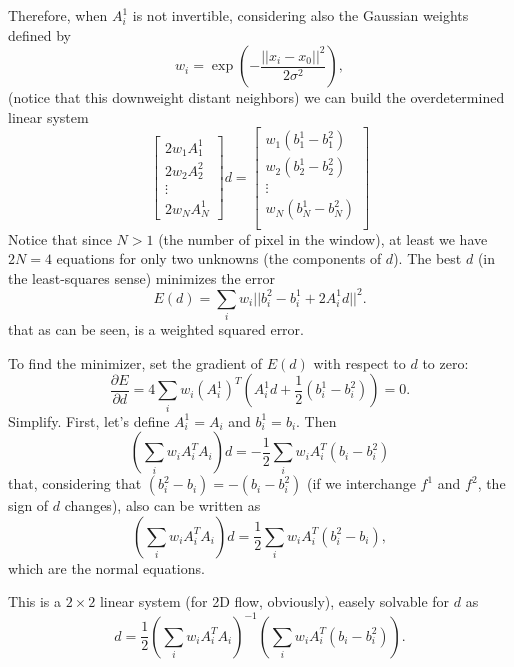 Therefore, when $A^1_i$ is not invertible, considering also the Gaussian weights defined by
\begin{equation}
  w_i = \exp\left( -\frac{||x_i-x_0||^2}{2\sigma^2} \right),
\end{equation}
(notice that this downweight distant neighbors) we can build the overdetermined linear system
\begin{equation}
  \begin{bmatrix}
2w_1A^1_1 \\
2w_2A^2_2 \\
\vdots \\
2w_NA^1_N
\end{bmatrix}
d =
\begin{bmatrix}
w_1(b^1_1-b^2_1) \\
w_2(b^1_2-b^2_2) \\
\vdots \\
w_N(b^1_N-b^2_N) \\
\end{bmatrix}
\end{equation}
Notice that since $N>1$ (the number of pixel in the window), at least we have $2N=4$ equations for only two unknowns (the components of $d$). The best $d$ (in the least-squares sense) minimizes the error
\begin{equation}
  E(d) = \sum_i w_i ||b^2_i - b^1_i + 2A^1_id||^2.
\end{equation}
that as can be seen, is a weighted squared error.

To find the minimizer, set the gradient of $E(d)$ with respect to $d$ to zero:
\begin{equation}
  \frac{\partial E}{\partial d} = 4\sum_i w_i(A^1_i)^T\left(A^1_i d + \frac{1}{2}(b^1_i-b^2_i)\right) = 0.
\end{equation}
Simplify. First, let's define $A^1_i=A_i$ and $b^1_i=b_i$. Then
\begin{equation}
  \left( \sum_i w_iA_i^TA_i \right) d = -\frac{1}{2}\sum_i w_iA_i^T(b_i-b^2_i)
\end{equation}
that, considering that $(b^2_i - b_i) = -(b_i-b^2_i)$ (if we interchange $f^1$ and $f^2$, the sign of $d$ changes), also can be written as 
\begin{equation}
  \left( \sum_i w_iA_i^TA_i \right) d = \frac{1}{2}\sum_i w_iA_i^T(b^2_i-b_i),
\end{equation}
which are the normal equations.

This is a $2\times 2$ linear system (for 2D flow, obviously), easely solvable for $d$ as
\begin{equation}
  d = \frac{1}{2}\left( \sum_i w_iA_i^TA_i \right)^{-1}\left(\sum_i w_iA_i^T(b_i-b^2_i)\right).
\end{equation}

